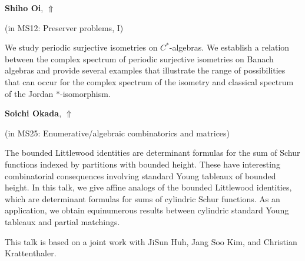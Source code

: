 \documentclass[ILAS2025-program.tex]{subfiles}
\begin{document}
\hypertarget{down0163}{}\begin{ilasabstract}
    
\textbf{Shiho Oi},  \hfill \hyperlink{up0163}{$\Uparrow$}
    
    
(in {\color{mstitle}MS12: Preserver problems, I})
        
\mtskip
    We study periodic surjective isometries on $C^{*}$-algebras.  We establish a relation between the complex spectrum of periodic surjective isometries on Banach algebras  and provide several examples that illustrate the range of possibilities that can occur for the complex spectrum of the isometry and classical spectrum of the Jordan $\ast$-isomorphism.

\end{ilasabstract}
    

\hypertarget{down0181}{}\begin{ilasabstract}
    
\textbf{Soichi Okada},  \hfill \hyperlink{up0181}{$\Uparrow$}
    
    
(in {\color{mstitle}MS25: Enumerative/algebraic combinatorics and matrices})
        
\mtskip
    The bounded Littlewood identities are determinant formulas for 
the sum of Schur functions indexed by partitions with bounded height. 
These have interesting combinatorial consequences involving 
standard Young tableaux of bounded height. In this talk, we 
give affine analogs of the bounded Littlewood identities, which 
are determinant formulas for sums of cylindric Schur functions. 
As an application, we obtain equinumerous results between cylindric 
standard Young tableaux and partial matchings.

This talk is based on a joint work with JiSun Huh, Jang Soo Kim, 
and Christian Krattenthaler.

\end{ilasabstract}
    
\end{document}
